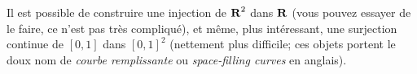 \begin{remark}
    Il est possible de construire une injection de $\operatorname{\mathbf{R}}^2$ dans $\operatorname{\mathbf{R}}$ (vous pouvez essayer de le faire, ce n'est pas très compliqué),
    et même, plus intéressant, une surjection continue de $[0,1]$ dans $[0,1]^2$ (nettement plus difficile; ces objets portent le doux nom de \textit{courbe remplissante} ou \textit{space-filling curves} en anglais).
\end{remark}